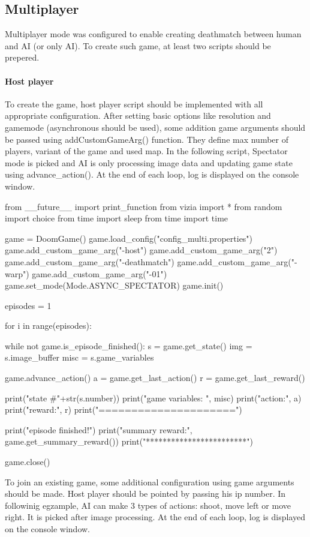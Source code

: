 \subsection {Multiplayer}
Multiplayer mode was configured to enable creating deathmatch between human and AI (or only AI). To create such game, at least two scripts should be prepered.

\paragraph{Host player}
To create the game, host player script should be implemented with all appropriate configuration. After setting basic options like resolution and gamemode (asynchronous should be used), some addition game arguments should be passed using addCustomGameArg() function. They define max number of players, variant of the game and used map. In the following script, Spectator mode is picked and AI is only processing image data and updating game state using advance\_action(). At the end of each loop, log is displayed on the console window.

\begin{pblock}
from __future__ import print_function
from vizia import *
from random import choice
from time import sleep
from time import time

game = DoomGame()
game.load_config("config_multi.properties")
game.add_custom_game_arg("-host")
game.add_custom_game_arg("2")
game.add_custom_game_arg("-deathmatch")
game.add_custom_game_arg("-warp")
game.add_custom_game_arg("-01")
game.set_mode(Mode.ASYNC_SPECTATOR)
game.init()

	
episodes = 1

for i in range(episodes):
	
	while not game.is_episode_finished():	
		s = game.get_state()
		img = s.image_buffer
		misc = s.game_variables

		game.advance_action()
		a = game.get_last_action()
		r = game.get_last_reward()
			
		print("state #"+str(s.number))
		print("game variables: ", misc)
		print("action:", a)
		print("reward:", r)
		print("=====================")
	
print("episode finished!")
print("summary reward:", game.get_summary_reward())
print("************************")

game.close()
\end{pblock}


To join an existing game, some additional configuration using game arguments should be made. Host player should be pointed by passing his ip number. In followinig egzample, AI can make 3 types of actions: shoot, move left or move right. It is picked after image processing. At the end of each loop, log is displayed on the console window.

